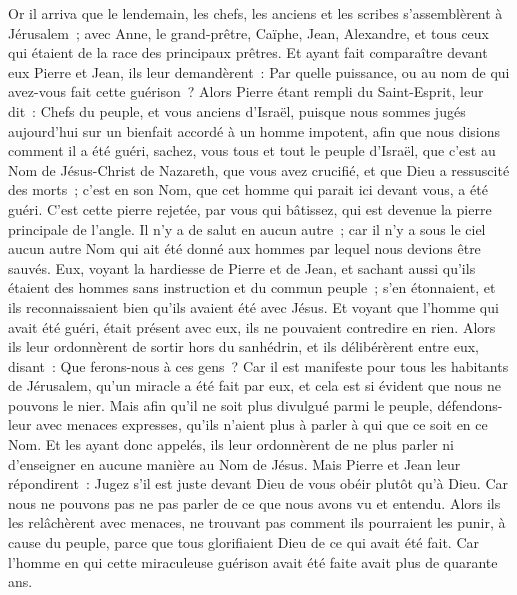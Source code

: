 \begin{multicols}{2}
Or il arriva que le lendemain, les chefs, les anciens et les scribes s'assemblèrent à Jérusalem~;
avec Anne, le grand-prêtre, Caïphe, Jean, Alexandre, et tous ceux qui étaient de la race des principaux prêtres.
Et ayant fait comparaître devant eux Pierre et Jean, ils leur demandèrent~: Par quelle puissance, ou au nom de qui avez-vous fait cette guérison~?
Alors Pierre étant rempli du Saint-Esprit, leur dit~: Chefs du peuple, et vous anciens d'Israël,
puisque nous sommes jugés aujourd'hui sur un bienfait accordé à un homme impotent, afin que nous disions comment il a été guéri,
sachez, vous tous et tout le peuple d'Israël, que c'est au Nom de Jésus-Christ de Nazareth, que vous avez crucifié, et que Dieu a ressuscité des morts~; c'est en son Nom, que cet homme qui parait ici devant vous, a été guéri.
C'est cette pierre rejetée, par vous qui bâtissez, qui est devenue la pierre principale de l'angle.
Il n'y a de salut en aucun autre~; car il n'y a sous le ciel aucun autre Nom qui ait été donné aux hommes par lequel nous devions être sauvés.
Eux, voyant la hardiesse de Pierre et de Jean, et sachant aussi qu'ils étaient des hommes sans instruction et du commun peuple~; s'en étonnaient, et ils reconnaissaient bien qu'ils avaient été avec Jésus.
Et voyant que l'homme qui avait été guéri, était présent avec eux, ils ne pouvaient contredire en rien.
Alors ils leur ordonnèrent de sortir hors du sanhédrin, et ils délibérèrent entre eux, disant~: Que ferons-nous à ces gens~?
Car il est manifeste pour tous les habitants de Jérusalem, qu'un miracle a été fait par eux, et cela est si évident que nous ne pouvons le nier.
Mais afin qu'il ne soit plus divulgué parmi le peuple, défendons-leur avec menaces expresses, qu'ils n'aient plus à parler à qui que ce soit en ce Nom.
Et les ayant donc appelés, ils leur ordonnèrent de ne plus parler ni d'enseigner en aucune manière au Nom de Jésus. 
Mais Pierre et Jean leur répondirent~: Jugez s'il est juste devant Dieu de vous obéir plutôt qu'à Dieu.
Car nous ne pouvons pas ne pas parler de ce que nous avons vu et entendu.
Alors ils les relâchèrent avec menaces, ne trouvant pas comment ils pourraient les punir, à cause du peuple, parce que tous glorifiaient Dieu de ce qui avait été fait.
Car l'homme en qui cette miraculeuse guérison avait été faite avait plus de quarante ans.

\end{multicols}
